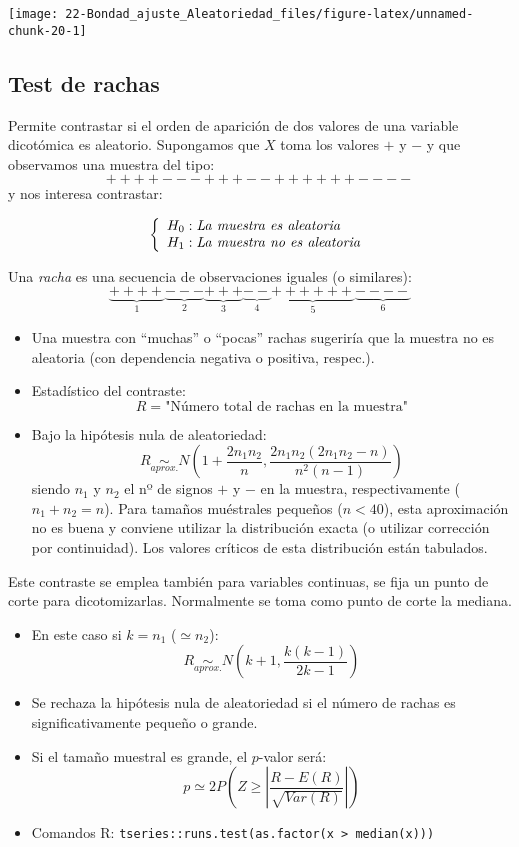 \documentclass[
]{book}
\theoremstyle{break}
\theoremstyle{definition}
\theoremstyle{definition}
\theoremstyle{definition}
\theoremstyle{remark}
\begin{document}
\begin{center}\texttt{[image: 22-Bondad\_ajuste\_Aleatoriedad\_files/figure-latex/unnamed-chunk-20-1]} \end{center}

\hypertarget{test-de-rachas}{%
\subsection{Test de rachas}\label{test-de-rachas}}

Permite contrastar si el orden de aparición de dos valores de una
variable dicotómica es aleatorio.
Supongamos que \(X\) toma los valores \(+\) y \(-\)
y que observamos una muestra del tipo:
\[++++---+++--++++++----\]
y nos interesa contrastar:

\[\left\{ \begin{array}[c]{l}
    H_{0}:\mathit{La\ muestra\ es\ aleatoria}\\
    H_{1}:\mathit{La\ muestra\ no\ es\ aleatoria}
\end{array}
\right.\]

Una \emph{racha} es una secuencia de observaciones iguales (o
similares):
\[\underbrace{++++}_{1}\underbrace{---}_{2}\underbrace{+++}_{3}
\underbrace{--}_{4}\underbrace{++++++}_{5}\underbrace{----}_{6}\]

\begin{itemize}
\item
  Una muestra con ``muchas'' o ``pocas'' rachas sugeriría que la muestra
  no es aleatoria (con dependencia negativa o positiva, respec.).
\item
  Estadístico del contraste:
  \[R=\text{"Número total de rachas en la muestra"}\]
\item
  Bajo la hipótesis nula de aleatoriedad:
  \[R\underset{aprox.}{\sim}N\left(  1+\frac{2n_{1}n_{2}}{n},
  \frac{2n_{1}n_{2}(2n_{1}n_{2}-n)}{n^{2}(n-1)}\right)\]
  siendo \(n_{1}\) y \(n_{2}\) el nº de signos \(+\) y \(-\) en la muestra,
  respectivamente (\(n_{1}+n_{2}=n\)).
  Para tamaños muéstrales pequeños (\(n<40\)), esta aproximación
  no es buena y conviene utilizar la distribución exacta (o utilizar
  corrección por continuidad). Los valores críticos de esta
  distribución están tabulados.
\end{itemize}

Este contraste se emplea también para variables continuas, se fija
un punto de corte para dicotomizarlas. Normalmente se toma como punto de corte la mediana.

\begin{itemize}
\item
  En este caso si \(k=n_{1}\) (\(\simeq n_{2}\)):
  \[R\underset{aprox.}{\sim}N\left(  k+1,\frac{k(k-1)}{2k-1}\right)\]
\item
  Se rechaza la hipótesis nula de aleatoriedad si el número de rachas
  es significativamente pequeño o grande.
\item
  Si el tamaño muestral es grande, el \(p\)-valor será:
  \[p \simeq 2 P\left( Z \geq \left\vert 
  \frac{R-E(R)}{\sqrt{Var(R)}} \right\vert \right)\]
\item
  Comandos R: \texttt{tseries::runs.test(as.factor(x\ \textgreater{}\ median(x)))}
\end{itemize}
\end{document}
